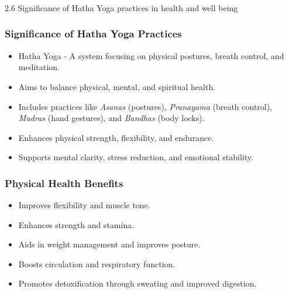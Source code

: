 \begin{frame}[fragile]\frametitle{}
\begin{center}
{\Large 2.6  Significance of Hatha Yoga practices in health and well being}
\end{center}
\end{frame}

\begin{frame}[fragile]\frametitle{Significance of Hatha Yoga Practices}

      \begin{itemize}
		\item Hatha Yoga - A system focusing on physical postures, breath control, and meditation.
		\item Aims to balance physical, mental, and spiritual health.
		\item Includes practices like \textit{Asanas} (postures), \textit{Pranayama} (breath control), \textit{Mudras} (hand gestures), and \textit{Bandhas} (body locks).
		\item Enhances physical strength, flexibility, and endurance.
		\item Supports mental clarity, stress reduction, and emotional stability.
	  \end{itemize}

\end{frame}

\begin{frame}[fragile]\frametitle{Physical Health Benefits}

      \begin{itemize}
		\item Improves flexibility and muscle tone.
		\item Enhances strength and stamina.
		\item Aids in weight management and improves posture.
		\item Boosts circulation and respiratory function.
		\item Promotes detoxification through sweating and improved digestion.
	  \end{itemize}

\end{frame}

